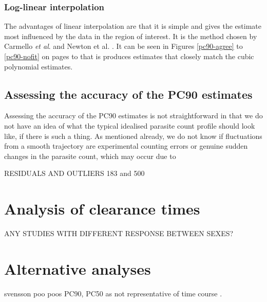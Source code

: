 \subsubsection*{Log-linear interpolation}
The advantages of linear interpolation are that it is simple and gives the estimate most influenced by the data in the region of interest. It is the method chosen by Carmello {\it et al}. \cite{carmello} and Newton {et al}. \cite{newton}. It can be seen in Figures \ref{pc90-agree} to \ref{pc90-nofit} on pages \pageref{pc90-agree} to \pageref{pc90-nofit} that is produces estimates that closely match the cubic polynomial estimates.

\subsection{Assessing the accuracy of the PC90 estimates}
Assessing the accuracy of the PC90 estimates is not straightforward in that we do not have an idea of what the typical idealised parasite count profile should look like, if there is such a thing. As mentioned already, we do not know if fluctuations from a smooth trajectory are experimental counting errors or genuine sudden changes in the parasite count, which may occur due to 

RESIDUALS AND OUTLIERS 183 and 500

\section{Analysis of clearance times}

ANY STUDIES WITH DIFFERENT RESPONSE BETWEEN SEXES?
\section{Alternative analyses}
svensson poo poos PC90, PC50 as not representative of time course \cite{svensson}.